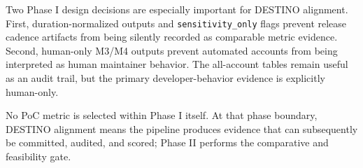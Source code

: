Two Phase I design decisions are especially important for DESTINO alignment. First, duration-normalized outputs and
\texttt{sensitivity\_only} flags prevent release cadence artifacts from being silently recorded as comparable metric evidence.
Second, human-only M3/M4 outputs prevent automated accounts from being interpreted as human maintainer behavior. The all-account
tables remain useful as an audit trail, but the primary developer-behavior evidence is explicitly human-only.

No PoC metric is selected within Phase I itself. At that phase boundary, DESTINO alignment means the pipeline produces evidence
that can subsequently be committed, audited, and scored; Phase II performs the comparative and feasibility gate.
